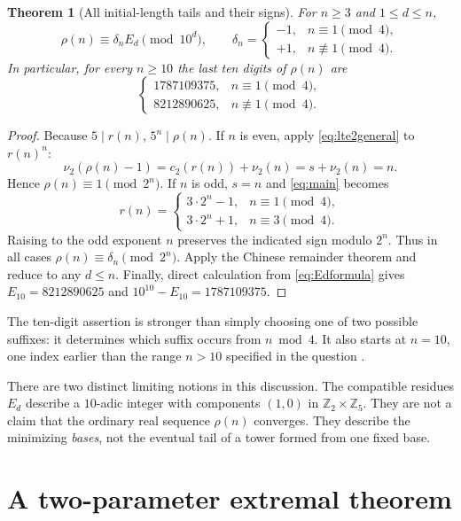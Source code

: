 \documentclass[11pt,a4paper]{article}
\newtheorem{theorem}{Theorem}[section]
\theoremstyle{definition}
\newcommand{\Z}{\mathbb Z}
\begin{document}
\begin{theorem}[All initial-length tails and their signs]
\label{thm:tail}
For $n\ge3$ and $1\le d\le n$,
\begin{equation}
\rho(n)\equiv\delta_nE_d\pmod{10^d},\qquad
\delta_n=\begin{cases}-1,&n\equiv1\pmod4,\\+1,&n\not\equiv1\pmod4.
\end{cases}
\label{eq:tail}
\end{equation}
In particular, for every $n\ge10$ the last ten digits of $\rho(n)$ are
\begin{equation}
\begin{cases}
1787109375,&n\equiv1\pmod4,\\
8212890625,&n\not\equiv1\pmod4.
\end{cases}
\label{eq:ten}
\end{equation}
\end{theorem}
\begin{proof}
Because $5\mid r(n)$, $5^n\mid\rho(n)$.
If $n$ is even, apply \eqref{eq:lte2general} to $r(n)^n$:
\[
\nu_2(\rho(n)-1)=c_2(r(n))+\nu_2(n)=s+\nu_2(n)=n.
\]
Hence $\rho(n)\equiv1\pmod{2^n}$.
If $n$ is odd, $s=n$ and \eqref{eq:main} becomes
\[
r(n)=\begin{cases}3\cdot2^n-1,&n\equiv1\pmod4,\\
3\cdot2^n+1,&n\equiv3\pmod4.
\end{cases}
\]
Raising to the odd exponent $n$ preserves the indicated sign modulo
$2^n$. Thus in all cases $\rho(n)\equiv\delta_n\pmod{2^n}$.
Apply the Chinese remainder theorem and reduce to any $d\le n$.
Finally, direct calculation from \eqref{eq:Edformula} gives
$E_{10}=8212890625$ and $10^{10}-E_{10}=1787109375$.
\end{proof}

The ten-digit assertion is stronger than simply choosing one of two
possible suffixes: it determines which suffix occurs from $n\bmod4$.
It also starts at $n=10$, one index earlier than the range $n>10$
specified in the question \cite{mo2025}.

There are two distinct limiting notions in this discussion. The
compatible residues $E_d$ describe a $10$-adic integer with components
$(1,0)$ in $\Z_2\times\Z_5$. They are not a claim that the ordinary real
sequence $\rho(n)$ converges. They describe the minimizing \emph{bases},
not the eventual tail of a tower formed from one fixed base.

\section{A two-parameter extremal theorem}
\label{sec:twoparameter}
\end{document}
